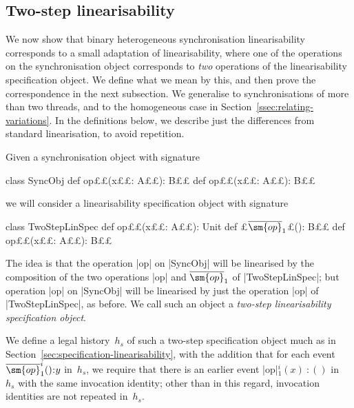 
\subsection{Two-step linearisability}

We now show that binary heterogeneous synchronisation linearisability
corresponds to a small adaptation of linearisability, where one of the
operations on the synchronisation object corresponds to \emph{two} operations
of the linearisability specification object.  We define what we mean by this,
and then prove the correspondence in the next subsection.  We generalise to
synchronisations of more than two threads, and to the homogeneous case in
Section~\ref{ssec:relating-variations}.  In the definitions below, we describe
just the differences from standard linearisation, to avoid repetition.

Given a synchronisation object with signature
\begin{scala}
class SyncObj{
  def op££(x££: A££): B££
  def op££(x££: A££): B££
}
\end{scala}
we will consider a linearisability specification object with signature
%
\begin{scala}
class TwoStepLinSpec{
  def op££(x££: A££): Unit
  def £$\overline{\sm{op}}_1$£(): B££
  def op££(x££: A££): B££
}
\end{scala}
%
The idea is that the operation |op| on |SyncObj| will be linearised by the
composition of the two operations |op| and $\overline{\sm{op}}_1$ of
|TwoStepLinSpec|; but operation |op| on |SyncObj| will be linearised by
just the operation |op| of |TwoStepLinSpec|, as before.  We call such an
object a \emph{two-step linearisability specification object}.

We define a legal history~$h_s$ of such a two-step specification object much
as in Section~\ref{sec:specification-linearisability}, with the addition that
for each event $\overline{\sm{op}}_1^i()\::y$ in~$h_s$, we require that there
is an earlier event |op|$_1^i(x)\::()$ in~$h_s$ with the same invocation
identity; other than in this regard, invocation identities are not repeated
in~$h_s$.

